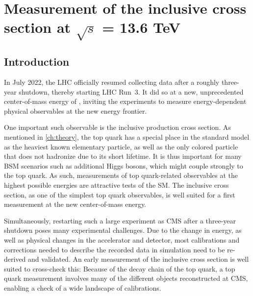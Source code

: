 \chapter{Measurement of the inclusive \ttbartitle cross section at \texorpdfstring{$\sqrt{s}$}{sqrt(s)} = 13.6 TeV}
\label{ch:ttxs}


\section{Introduction}



In July 2022, the LHC officially resumed collecting data after a roughly three-year shutdown, thereby starting LHC Run~3. It did so at a new, unprecedented center-of-mass energy of \sqrtsRIII, inviting the experiments to measure energy-dependent physical observables at the new energy frontier.

One important such observable is the inclusive \ttbar production cross section. As mentioned in \cref{ch:theory}, the top quark has a special place in the standard model as the heaviest known elementary particle, as well as the only colored particle that does not hadronize due to its short lifetime. 
It is thus important for many BSM scenarios such as additional Higgs bosons, which might couple strongly to the top quark. 
As such, measurements of top quark-related observables at the highest possible energies are attractive tests of the SM. The inclusive \ttbar cross section, as one of the simplest top quark observables, is well suited for a first measurement at the new center-of-mass energy.

Simultaneously, restarting such a large experiment as CMS after a three-year shutdown poses many experimental challenges. Due to the change in energy, as well as physical changes in the accelerator and detector, most calibrations and corrections needed to describe the recorded data in simulation need to be re-derived and validated. An early measurement of the inclusive \ttbar cross section is well suited to cross-check this: Because of the decay chain of the top quark, a top quark measurement involves many of the different objects reconstructed at CMS, 
enabling a check of a wide landscape of calibrations.

